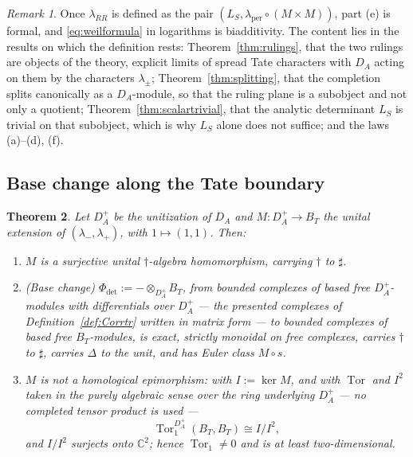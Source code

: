 \documentclass[11pt]{amsart}
\newtheorem{theorem}{Theorem}[section]
\theoremstyle{definition}
\theoremstyle{remark}
\newtheorem{remark}[theorem]{Remark}
\newcommand{\C}{\mathbb C}
\newcommand{\DA}{D_A}
\newcommand{\BT}{B_T}
\begin{document}
\begin{remark}\label{rem:whatRRis}
Once $\lambda_{RR}$ is defined as the pair
$(L_S,\lambda_{\mathrm{per}}\circ(M\times M))$, part (e) is formal, and
\eqref{eq:weilformula} in logarithms is biadditivity.  The content lies in the
results on which the definition rests: Theorem~\ref{thm:rulings}, that the two rulings are objects of the
theory, explicit limits of spread Tate characters with $\DA$ acting on them by
the characters $\lambda_{\pm}$; Theorem~\ref{thm:splitting}, that the
completion splits canonically as a $\DA$-module, so that the ruling plane is a
subobject and not only a quotient; Theorem~\ref{thm:scalartrivial}, that the
analytic determinant $L_S$ is trivial on that subobject, which is why $L_S$
alone does not suffice; and the laws (a)--(d), (f).
\end{remark}

\subsection{Base change along the Tate boundary}

\begin{theorem}\label{thm:basechange}
Let $\DA^{+}$ be the unitization of $\DA$ and $M:\DA^{+}\to\BT$ the unital
extension of $(\lambda_-,\lambda_+)$, with $1\mapsto(1,1)$.  Then:
\begin{enumerate}
\item[(a)] $M$ is a surjective unital $\dagger$-algebra homomorphism, carrying
$\dagger$ to $\sharp$.
\item[(b)] \emph{(Base change)}  $\Phi_{\det}:=-\otimes_{\DA^{+}}\BT$, from
bounded complexes of based free $\DA^{+}$-modules with differentials over
$\DA^{+}$ --- the presented complexes of Definition~\ref{def:Corrtr} written in
matrix form --- to bounded complexes of based free $\BT$-modules, is exact,
strictly monoidal on free complexes, carries $\dagger$ to $\sharp$, carries
$\Delta$ to the unit, and has Euler class $M\circ s$.
\item[(c)] $M$ is \emph{not} a homological epimorphism: with $I:=\ker M$, and
with $\operatorname{Tor}$ and $I^{2}$ taken in the purely algebraic sense over
the ring underlying $\DA^{+}$ --- no completed tensor product is used ---
\begin{equation}\label{eq:tor}
\operatorname{Tor}_1^{\DA^{+}}(\BT,\BT)\cong I/I^{2},
\end{equation}
and $I/I^{2}$ surjects onto $\C^{2}$; hence $\operatorname{Tor}_1\ne0$ and is
at least two-dimensional.
\end{enumerate}
\end{theorem}
\end{document}
